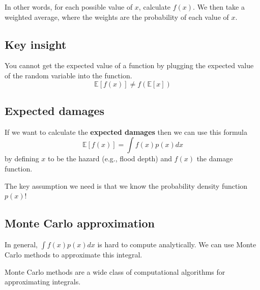 \documentclass[
  letterpaper,
  DIV=11,
  numbers=noendperiod]{scrreprt}
\begin{document}
In other words, for each possible value of \(x\), calculate \(f(x)\). We
then take a weighted average, where the weights are the probability of
each value of \(x\).

\subsection{Key insight}\label{key-insight}

You cannot get the expected value of a function by plugging the expected
value of the random variable into the function. \[
\mathbb{E}[f(x)] \neq f(\mathbb{E}[x])
\]

\subsection{Expected damages}\label{expected-damages}

If we want to calculate the \textbf{expected damages} then we can use
this formula \[
\mathbb{E}[f(x)] = \int f(x) p(x) dx
\] by defining \(x\) to be the hazard (e.g., flood depth) and \(f(x)\)
the damage function.

\begin{tcolorbox}[enhanced jigsaw, arc=.35mm, breakable, title=\textcolor{quarto-callout-important-color}{\faExclamation}\hspace{0.5em}{Important}, coltitle=black, opacityback=0, bottomtitle=1mm, colback=white, left=2mm, opacitybacktitle=0.6, toptitle=1mm, colframe=quarto-callout-important-color-frame, leftrule=.75mm, titlerule=0mm, rightrule=.15mm, bottomrule=.15mm, colbacktitle=quarto-callout-important-color!10!white, toprule=.15mm]

The key assumption we need is that we know the probability density
function \(p(x)\)!

\end{tcolorbox}

\subsection{Monte Carlo approximation}\label{monte-carlo-approximation}

In general, \(\int f(x) p(x) dx\) is hard to compute analytically. We
can use Monte Carlo methods to approximate this integral.

\begin{tcolorbox}[enhanced jigsaw, arc=.35mm, breakable, title=\textcolor{quarto-callout-important-color}{\faExclamation}\hspace{0.5em}{Important}, coltitle=black, opacityback=0, bottomtitle=1mm, colback=white, left=2mm, opacitybacktitle=0.6, toptitle=1mm, colframe=quarto-callout-important-color-frame, leftrule=.75mm, titlerule=0mm, rightrule=.15mm, bottomrule=.15mm, colbacktitle=quarto-callout-important-color!10!white, toprule=.15mm]

Monte Carlo methods are a wide class of computational algorithms for
approximating integrals.

\end{tcolorbox}
\end{document}
